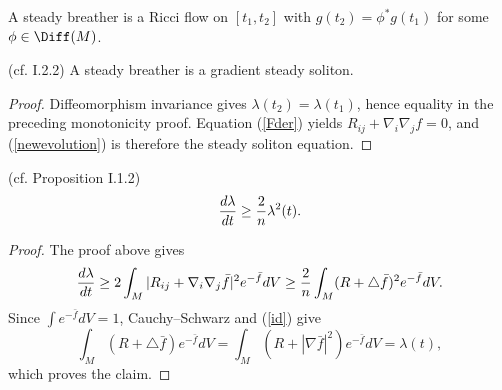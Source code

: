 \begin{definition}
  \label{def:kl-invariant-its-applications-steady-breather-definition}
A steady breather is a Ricci flow on $[t_1,t_2]$ with
$g(t_2)=\phi^*g(t_1)$ for some $\phi\in\Diff(M)$.
\end{definition}

\begin{proposition}
  \label{prop:kl-invariant-its-applications-rigidity-steady-breathers}
  (cf. I.2.2) \label{steadybreather}
A steady breather is a gradient steady soliton.
\end{proposition}
\begin{proof}
\sketch
Diffeomorphism invariance gives $\lambda(t_2)=\lambda(t_1)$, hence equality in
the preceding monotonicity proof. Equation (\ref{Fder}) yields
$R_{ij}+\nabla_i\nabla_jf=0$, and (\ref{newevolution}) is therefore the steady
soliton equation.
\end{proof}

\begin{lemma}
  \label{lem:kl-invariant-its-applications-differential-inequality-entropy}
  (cf. Proposition I.1.2) \label{2/3}
\begin{equation}
{d\lambda\over dt}\ge {2\over n}\lambda^2(t).
\end{equation}
\end{lemma}
\begin{proof}
\sketch
The proof above gives
\begin{equation}\label{dlambdadt}
{d\lambda\over dt}\ge2\int_M|R_{ij}+\nabla_i\nabla_j\bar f|^2e^{-\bar f}dV
\ge {2\over n}\int_M(R+\triangle\bar f)^2e^{-\bar f}dV.
\end{equation}
Since $\int e^{-\bar f}dV=1$, Cauchy--Schwarz and (\ref{id}) give
\begin{equation}\label{using}
\int_M(R+\triangle\bar f)e^{-\bar f}dV
=\int_M(R+|\nabla\bar f|^2)e^{-\bar f}dV=\lambda(t),
\end{equation}
which proves the claim.
\end{proof}

